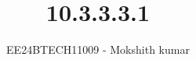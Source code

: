 \documentclass[journal]{IEEEtran}
\begin{document}

\vspace{3cm}



\title{10.3.3.3.1}
\author{EE24BTECH11009 - Mokshith kumar}
{\let\newpage\relax\maketitle}

\renewcommand{\thefigure}{\theenumi}
\renewcommand{\thetable}{\theenumi}
\setlength{\intextsep}{10pt} %


\renewcommand{\thetable}{\theenumi}
\end{document}
